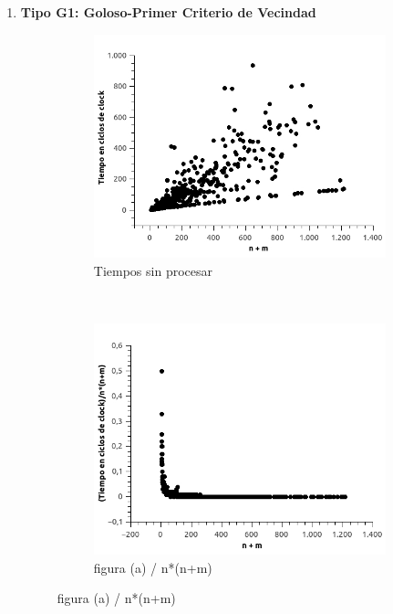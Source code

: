 \begin{enumerate}
\begin{figure}[H]
\end{figure}

\item \textbf{Tipo G1: Goloso-Primer Criterio de Vecindad}

\begin{figure}[H]
        \centering
        \begin{subfigure}[b]{0.5\textwidth}
                \includegraphics[width=\textwidth]{imagenes/ejer4-grafG1-1.jpg}
                \caption{Tiempos sin procesar}
        \end{subfigure}%
        ~ %
        \begin{subfigure}[b]{0.5\textwidth}
                \includegraphics[width=\textwidth]{imagenes/ejer4-grafG1-2.jpg}
                \caption{figura (a) / n*(n+m)}
        \end{subfigure}


\end{figure}
\end{enumerate}
